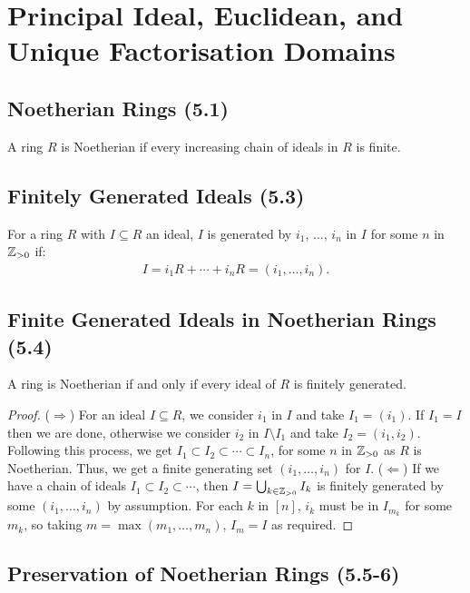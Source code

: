 \section{Principal Ideal, Euclidean, and Unique Factorisation Domains}

\subsection{Noetherian Rings (5.1)} \label{5.1}

A ring $R$ is Noetherian if every increasing chain of ideals in $R$
is finite.

\subsection{Finitely Generated Ideals (5.3)} \label{5.3}

For a ring $R$ with $I \subseteq R$ an ideal, $I$ is generated by
$i_1$, $\ldots$, $i_n$ in $I$ for some $n$ in $\mathbb{Z}_{>0}$ if:
\begin{align*}
    I = i_1R + \cdots + i_nR = (i_1, \ldots, i_n).
\end{align*}

\subsection{Finite Generated Ideals in Noetherian Rings (5.4)} \label{5.4}

A ring is Noetherian if and only if every ideal of $R$ is finitely
generated.

\begin{proof}
    ($\Longrightarrow$) For an ideal $I \subseteq R$, we consider
    $i_1$ in $I$ and take $I_1 = (i_1)$. If $I_1 = I$ then we are
    done, otherwise we consider $i_2$ in $I \setminus I_1$ and
    take $I_2 = (i_1, i_2)$. Following this process, we get
    $I_1 \subset I_2 \subset \cdots \subset I_n$, for some $n$ in
    $\mathbb{Z}_{>0}$ as $R$ is Noetherian. Thus, we get a finite 
    generating set $(i_1, \ldots, i_n)$ for $I$.
    \bs
    ($\Longleftarrow$) If we have a chain of ideals
    $I_1 \subset I_2 \subset \cdots$, then 
    $I = \bigcup_{k \in \mathbb{Z}_{>0}} I_k$ is finitely generated
    by some $(i_1, \ldots, i_n)$ by assumption. For each $k$ in
    $[n]$, $i_k$ must be in $I_{m_k}$ for some $m_k$, so
    taking $m = \max(m_1, \ldots, m_n)$, $I_m = I$ as required.
\end{proof}

\subsection{Preservation of Noetherian Rings (5.5-6)} \label{5.5} \label{5.6}

